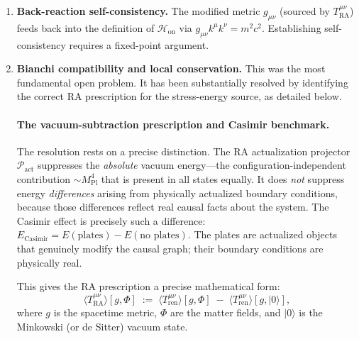 \documentclass[11pt,a4paper]{article}
\theoremstyle{plain}
\theoremstyle{definition}
\theoremstyle{remark}
\newcommand{\Pact}{\mathcal{P}_{\mathrm{act}}}
\newcommand{\Hon}{\mathcal{H}_{\mathrm{on}}}
\newcommand{\Tact}{T^{\mu\nu}_{\mathrm{RA}}}
\newcommand{\ket}[1]{|#1\rangle}
\begin{document}
\begin{enumerate}[label=(\roman*)]
  \item \textbf{Back-reaction self-consistency.} The modified metric $g_{\mu\nu}$
  (sourced by $\Tact$) feeds back into the definition of $\Hon$ via
  $g_{\mu\nu}k^{\mu}k^{\nu} = m^{2}c^{2}$. Establishing self-consistency
  requires a fixed-point argument.

  \item \textbf{Bianchi compatibility and local conservation.}
  This was the most fundamental open problem. It has been substantially
  resolved by identifying the correct RA prescription for the
  stress-energy source, as detailed below.

  \paragraph{The vacuum-subtraction prescription and Casimir benchmark.}
  The resolution rests on a precise distinction. The RA actualization
  projector $\Pact$ suppresses the \emph{absolute} vacuum energy---the
  configuration-independent contribution $\sim M_{\mathrm{Pl}}^4$ that
  is present in all states equally. It does \emph{not} suppress energy
  \emph{differences} arising from physically actualized boundary
  conditions, because those differences reflect real causal facts about
  the system. The Casimir effect is precisely such a difference:
  $E_{\mathrm{Casimir}} = E(\text{plates}) - E(\text{no plates})$. The
  plates are actualized objects that genuinely modify the causal graph;
  their boundary conditions are physically real.

  This gives the RA prescription a precise mathematical form:
  \begin{equation}
    \langle\Tact\rangle[g,\Phi]
    \;:=\;
    \langle T^{\mu\nu}_{\mathrm{ren}}\rangle[g,\Phi]
    \;-\;
    \langle T^{\mu\nu}_{\mathrm{ren}}\rangle[g,\ket{0}],
    \label{eq:ra_prescription}
  \end{equation}
  where $g$ is the spacetime metric, $\Phi$ are the matter fields, and
  $\ket{0}$ is the Minkowski (or de Sitter) vacuum state.


\end{enumerate}
\end{document}

